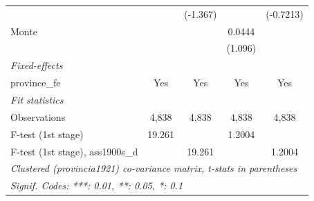 \begin{table}[htbp]
\begin{tabular}{lcccc}
$$                                       &                        & (-1.367)                      &                        & (-0.7213)\\   
      Monte                            &                        &                               & 0.0444                 &   \\   
                                       &                        &                               & (1.096)                &   \\   
      \midrule
      \emph{Fixed-effects}\\
      province\_fe                     & Yes                    & Yes                           & Yes                    & Yes\\  
      \midrule
      \emph{Fit statistics}\\
      Observations                     & 4,838                  & 4,838                         & 4,838                  & 4,838\\  
      F-test (1st stage)               & 19.261                 &                               & 1.2004                 & \\  
      F-test (1st stage), ass1900s\_d  &                        & 19.261                        &                        & 1.2004\\  
      \midrule \midrule
      \multicolumn{5}{l}{\emph{Clustered (provincia1921) co-variance matrix, t-stats in parentheses}}\\
      \multicolumn{5}{l}{\emph{Signif. Codes: ***: 0.01, **: 0.05, *: 0.1}}\\
   \end{tabular}
\end{table}



